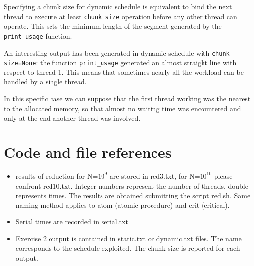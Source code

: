 \documentclass[10pt,a4paper]{article}
\begin{document}
Specifying a chunk size for dynamic schedule is equivalent to bind the next thread to execute at least \texttt{chunk size} operation before any other thread can operate. This sets the minimum length of the segment generated by the \texttt{print\_usage} function.

An interesting output has been generated in dynamic schedule with \texttt{chunk size=None}: the function \texttt{print\_usage} generated an almost straight line with respect to thread 1. This means that sometimes nearly all the workload can be handled by a single thread.

In this specific case we can suppose that the first thread working was the nearest to the allocated memory, so that almost no waiting time was encountered and only at the end another thread was involved.

\section*{Code and file references}

\begin{itemize}
	\item results of reduction for N=$10^9$ are stored in red3.txt, for N=$10^{10}$ please confront red10.txt. Integer numbers represent the number of threads, double represents times. The results are obtained submitting the script red.sh. Same naming method applies to atom (atomic procedure) and crit (critical).
	\item Serial times are recorded in serial.txt
	\item Exercise 2 output is contained in static.txt or dynamic.txt files. The name corresponds to the schedule exploited. The chunk size is reported for each output.
	\end{itemize}		
\end{document}
